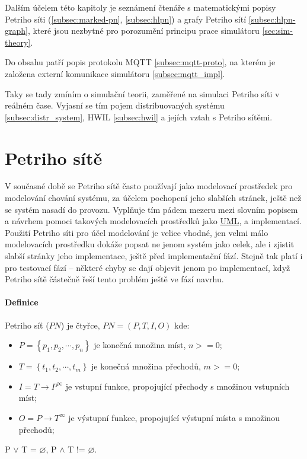 Dalším účelem této kapitoly je seznámení čtenáře s matematickými popisy Petriho síti (\ref{subsec:marked-pn}, \ref{subsec:hlpn}) a grafy Petriho sítí \ref{subsec:hlpn-graph}, které jsou nezbytné pro porozumění principu prace simulátoru \ref{sec:sim-theory}.

Do obsahu patří popis protokolu MQTT \ref{subsec:mqtt-proto}, na kterém je založena externí komunikace simulátoru \ref{subsec:mqtt_impl}.

Taky se tady zmíním o simulační teorii, zaměřené na simulaci Petriho síti v reálném čase. Vyjasní se tím pojem distribuovaných systému \ref{subsec:distr_system}, HWIL \ref{subsec:hwil} a jejích vztah s Petriho sítěmi.

\section{Petriho sítě}
V současné době se Petriho sítě často používají jako modelovací prostředek pro modelování chování systému, za účelem pochopení jeho slabších stránek, ještě než se systém nasadí do provozu. Vyplňuje tím pádem mezeru mezi slovním popisem a návrhem pomoci takových modelovacích prostředků jako \href{https://en.wikipedia.org/wiki/Unified_Modeling_Language}{UML}, a implementací. Použití Petriho síti pro účel modelování je velice vhodné, jen velmi málo modelovacích prostředku dokáže popsat ne jenom systém jako celek, ale i zjistit slabší stránky jeho implementace, ještě před implementační fází. Stejně tak platí i pro testovací fází -- některé chyby se dají objevit jenom po implementací, když Petriho sítě částečně řeší tento problém ještě ve fází navrhu.

\paragraph{Definice}

Petriho síť ($PN$) je čtyřce, $PN = \left(P, T, I, O\right)$ kde:
  \begin{itemize}
    \item $P = \left\{p_1, p_2, \cdots , p_n\right\}$ je konečná množina míst, $n >= 0$; \\
    \item $T = \left\{t_1, t_2, \cdots , t_m\right\}$ je konečná množina přechodů, $m >= 0$; \\
    \item $I = T \rightarrow P^\infty$ je vstupní funkce, propojující přechody s množinou vstupních míst; \\
    \item $O = P \rightarrow T^\infty$ je výstupní funkce, propojující výstupní místa s množinou přechodů; \\
  \end{itemize}
P $\vee$ T = $\varnothing$, P $\wedge$ T != $\varnothing$.

